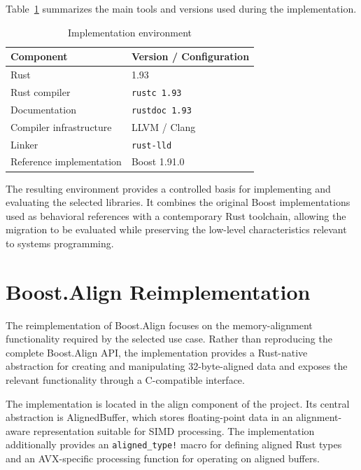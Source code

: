 Table~\ref{tab:implementation_environment} summarizes the main tools and
versions used during the implementation.



\begin{table}[H]
    \centering
    \renewcommand{\arraystretch}{1.2}
    \begin{tabular}{|l|l|}
        \hline
        \textbf{Component} & \textbf{Version / Configuration} \\ \hline
        Rust & 1.93 \\ \hline
        Rust compiler & \texttt{rustc 1.93} \\ \hline
        Documentation & \texttt{rustdoc 1.93} \\ \hline
        Compiler infrastructure & LLVM / Clang \\ \hline
        Linker & \texttt{rust-lld} \\ \hline
        Reference implementation & Boost 1.91.0 \\ \hline
    \end{tabular}
    \caption{Implementation environment}
    \label{tab:implementation_environment}
\end{table}

The resulting environment provides a controlled basis for implementing and evaluating the selected libraries. 
It combines the original Boost implementations used as behavioral references with a contemporary Rust
toolchain, allowing the migration to be evaluated while preserving the low-level characteristics relevant to systems programming.


\section{Boost.Align Reimplementation}
\label{sec:align_reimplementation}

The reimplementation of Boost.Align focuses on the memory-alignment functionality required by the selected use case.
Rather than reproducing the complete Boost.Align API, the implementation provides a Rust-native abstraction for creating 
and manipulating 32-byte-aligned data and exposes the relevant functionality through a C-compatible interface.

The implementation is located in the align component of the project. 
Its central abstraction is AlignedBuffer, which stores floating-point data in an alignment-aware representation suitable for SIMD processing. 
The implementation additionally provides an \lstinline|aligned_type!| macro for defining aligned Rust types 
and an AVX-specific processing function for operating on aligned buffers.

